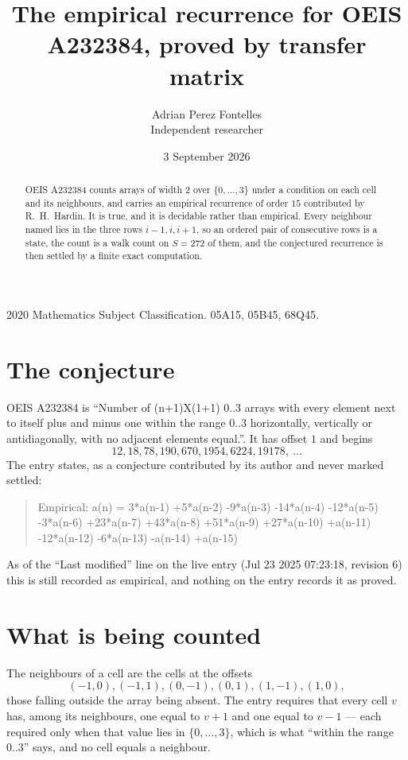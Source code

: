 \documentclass[11pt,a4paper]{article}
\title{The empirical recurrence for OEIS A232384, proved by transfer matrix}
\author{Adrian Perez Fontelles\\ \small Independent researcher}
\date{3 September 2026}
\theoremstyle{plain}
\theoremstyle{definition}
\begin{document}
\maketitle

\begin{abstract}
OEIS A232384 counts arrays of width $2$ over $\{0,\dots,3\}$ under a condition on each cell
and its neighbours, and carries an empirical recurrence of order $15$ contributed by
R.~H.~Hardin. It is true, and it is decidable rather than empirical. Every neighbour named lies
in the three rows $i-1,i,i+1$, so an ordered pair of consecutive rows is a state, the count is
a walk count on $S=272$ of them, and the conjectured recurrence is then settled by a finite
exact computation.
\end{abstract}

\noindent\small 2020 Mathematics Subject Classification. 05A15, 05B45, 68Q45.\normalsize

\section{The conjecture}

OEIS A232384 is ``Number of (n+1)X(1+1) 0..3 arrays with every element next to itself plus and minus one within the range 0..3 horizontally, vertically or antidiagonally, with no adjacent elements equal.''. It has offset $1$ and begins
\[
12, 18, 78, 190, 670, 1954, 6224, 19178,\ \dots
\]
The entry states, as a conjecture contributed by its author and never marked settled:
\begin{quote}
Empirical: a(n) = 3*a(n-1) +5*a(n-2) -9*a(n-3) -14*a(n-4) -12*a(n-5) -3*a(n-6) +23*a(n-7) +43*a(n-8) +51*a(n-9) +27*a(n-10) +a(n-11) -12*a(n-12) -6*a(n-13) -a(n-14) +a(n-15)
\end{quote}
As of the ``Last modified'' line on the live entry (Jul 23 2025 07:23:18, revision 6) this is still
recorded as empirical, and nothing on the entry records it as proved.

\section{What is being counted}

The neighbours of a cell are the cells at the offsets
\[
(-1,0), (-1,1), (0,-1), (0,1), (1,-1), (1,0),
\]
those falling outside the array being absent. The entry requires that every cell $v$ has, among its neighbours, one equal to $v+1$ and one equal to $v-1$ --- each required only when that value lies in $\{0,\dots,3\}$, which is what ``within the range $0..3$'' says, and no cell equals a neighbour.
\end{document}

